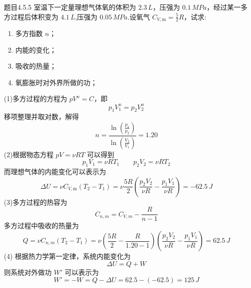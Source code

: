 \begin{question}{题目4.5.5}
    室温下一定量理想气体氧的体积为 $2.3 \,\si{L}$，压强为 $0.1 \,\si{MPa}$，经过某一多方过程后体积变为 $4.1 \,\si{L}$,压强为 $0.05 \,\si{MPa}$.设氧气 $C_{V, \mathrm{m}} = \frac{5}{2}R$，试求:
    \begin{enumerate}
        \item[(1)] 多方指数 $n$；
        \item[(2)] 内能的变化；
        \item[(3)] 吸收的热量；
        \item[(4)] 氧膨胀时对外界所做的功；
    \end{enumerate}
\end{question}
\begin{solution}
    (1)多方过程的方程为 $pV^n = C$，即
    $$
        p_1V_1^n = p_2V_2^n
    $$
    移项整理并取对数，解得
    $$
        n = \frac{
            \ln \left(\frac{p_1}{p_2}\right)
        }{
            \ln \left(\frac{V_2}{V_1}\right)
        }
        = 1.20
    $$
    (2)根据物态方程 $pV = \nu RT$ 可以得到
    $$
        p_1V_1 = \nu RT_1
        \quad \quad
        p_2V_2 = \nu RT_2
    $$
    而理想气体的内能变化可以表示为
    $$
        \Delta U
        = \nu C_{V,\mathrm{m}}(T_2 - T_1)
        = \nu \frac{5R}{2} \left(\frac{p_2V_2}{\nu R} - \frac{p_1V_1}{\nu R}\right)
        = -62.5 \,\si{J}
    $$
    (3)多方过程的热容为
    $$
        C_{n,m} = C_{V,m} - \frac{R}{n-1}
    $$
    多方过程中吸收的热量为
    $$
        Q = \nu C_{n,m} (T_2 - T_1)
        = \nu \left(\frac{5R}{2} - \frac{R}{1.20 - 1}\right) \left(\frac{p_2V_2}{\nu R} - \frac{p_1V_1}{\nu R}\right)
        = 62.5 \,\si{J}
    $$
    (4) 根据热力学第一定律，系统内能变化为
    $$
        \Delta U = Q + W
    $$
    则系统对外做功 $W'$ 可以表示为
    $$
        W' = -W = Q - \Delta{U} = 62.5 - (-62.5) = 125 \,\si{J}
    $$
\end{solution}

